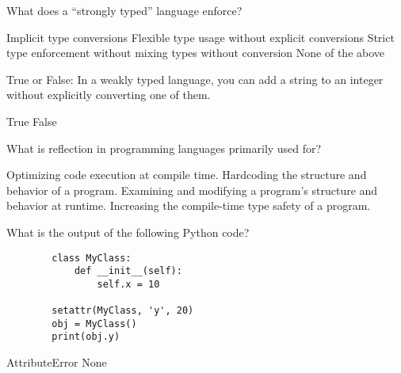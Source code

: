 \documentclass[12pt, addpoints, answers]{exam}
\begin{document}
\begin{questions}
	\question What does a “strongly typed” language enforce?
	\begin{choices}
		\choice Implicit type conversions
		\choice Flexible type usage without explicit conversions
		\CorrectChoice Strict type enforcement without mixing types without conversion
		\choice None of the above
	\end{choices}
				
	\question True or False: In a weakly typed language, you can add a string to an integer without explicitly converting one of them.
	\begin{choices}
		\CorrectChoice True
		\choice False
	\end{choices}



	\question What is reflection in programming languages primarily used for?
	\begin{choices}
		\choice Optimizing code execution at compile time.
		\choice Hardcoding the structure and behavior of a program.
		\CorrectChoice Examining and modifying a program's structure and behavior at runtime.
		\choice Increasing the compile-time type safety of a program.
	\end{choices}
				
	\question What is the output of the following Python code?
	\begin{verbatim}
		class MyClass:
		    def __init__(self):
		        self.x = 10
								
		setattr(MyClass, 'y', 20)
		obj = MyClass()
		print(obj.y)
	\end{verbatim}
	\begin{choices}
		\choice AttributeError
		\choice 10
		\choice None
		\CorrectChoice 20
	\end{choices}
				
				

\end{questions}
\end{document}
